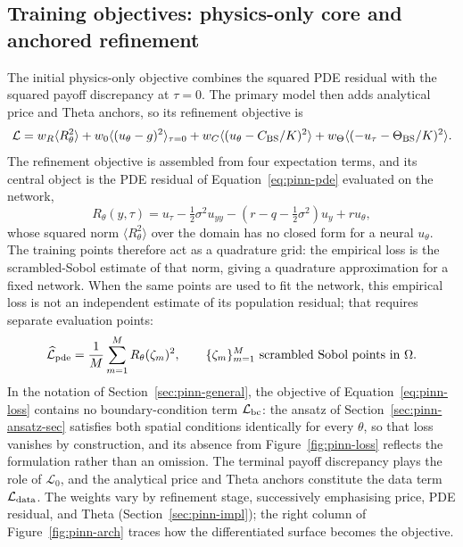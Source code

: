 \documentclass[11pt,a4paper]{article}
\begin{document}
\subsection{Training objectives: physics-only core and anchored refinement}
\label{sec:pinn-objectives}

The initial physics-only objective combines the squared PDE residual with the squared payoff discrepancy at $\tau=0$. The primary model then adds analytical price and Theta anchors, so its refinement objective is
\begin{equation}
\mathcal L=w_R\langle R_\theta^2\rangle+w_0\langle(u_\theta-g)^2\rangle_{\tau=0}
+w_C\langle(u_\theta-C_{\rm BS}/K)^2\rangle
+w_\Theta\langle(-u_\tau-\Theta_{\rm BS}/K)^2\rangle. \label{eq:pinn-loss}
\end{equation}
The refinement objective is assembled from four expectation terms, and its central object is the PDE residual of Equation~\eqref{eq:pinn-pde} evaluated on the network,
\begin{equation}
R_\theta(y,\tau)=u_\tau-\tfrac12\sigma^2u_{yy}-(r-q-\tfrac12\sigma^2)u_y+ru_\theta,
\label{eq:pinn-residual}
\end{equation}
whose squared norm $\langle R_\theta^2\rangle$ over the domain has no closed form for a neural $u_\theta$. The training points therefore act as a quadrature grid: the empirical loss is the scrambled-Sobol estimate of that norm, giving a quadrature approximation for a fixed network. When the same points are used to fit the network, this empirical loss is not an independent estimate of its population residual; that requires separate evaluation points:
\begin{equation}
\widehat{\mathcal L}_{\rm pde}=\frac{1}{M}\sum_{m=1}^{M}R_\theta(\zeta_m)^2,
\qquad \{\zeta_m\}_{m=1}^{M}\ \text{scrambled Sobol points in }\Omega.
\label{eq:pinn-empirical}
\end{equation}
In the notation of Section~\ref{sec:pinn-general}, the objective of Equation~\eqref{eq:pinn-loss} contains no boundary-condition term $\mathcal L_{\rm bc}$: the ansatz of Section~\ref{sec:pinn-ansatz-sec} satisfies both spatial conditions identically for every $\theta$, so that loss vanishes by construction, and its absence from Figure~\ref{fig:pinn-loss} reflects the formulation rather than an omission. The terminal payoff discrepancy plays the role of $\mathcal L_0$, and the analytical price and Theta anchors constitute the data term $\mathcal L_{\rm data}$. The weights vary by refinement stage, successively emphasising price, PDE residual, and Theta (Section~\ref{sec:pinn-impl}); the right column of Figure~\ref{fig:pinn-arch} traces how the differentiated surface becomes the objective.
\end{document}
